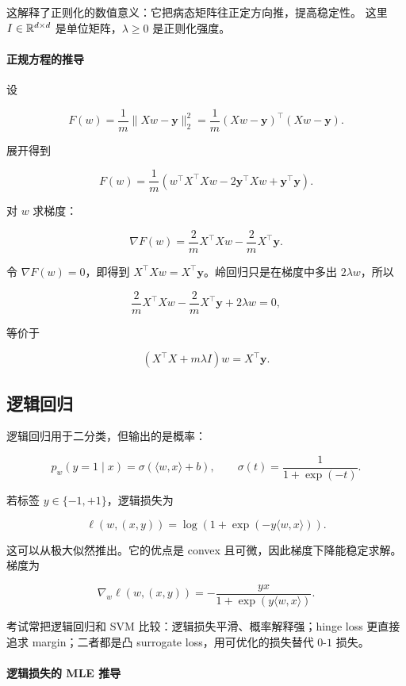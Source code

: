 这解释了正则化的数值意义：它把病态矩阵往正定方向推，提高稳定性。
这里 \(I\in\mathbb{R}^{d\times d}\) 是单位矩阵，\(\lambda\ge0\) 是正则化强度。

\paragraph{正规方程的推导}

设

\[
  F(w)=\frac1m\|Xw-\mathbf{y}\|_2^2
  =
  \frac1m(Xw-\mathbf{y})^\top(Xw-\mathbf{y}).
\]

展开得到

\[
  F(w)
  =
  \frac1m
  \left(
    w^\top X^\top Xw
    -
    2\mathbf{y}^\top Xw
    +
    \mathbf{y}^\top\mathbf{y}
  \right).
\]

对 \(w\) 求梯度：

\[
  \nabla F(w)
  =
  \frac{2}{m}X^\top Xw
  -
  \frac{2}{m}X^\top\mathbf{y}.
\]

令 \(\nabla F(w)=0\)，即得到 \(X^\top Xw=X^\top\mathbf{y}\)。岭回归只是在梯度中多出 \(2\lambda w\)，所以

\[
  \frac{2}{m}X^\top Xw
  -
  \frac{2}{m}X^\top\mathbf{y}
  +
  2\lambda w
  =
  0,
\]

等价于

\[
  (X^\top X+m\lambda I)w=X^\top\mathbf{y}.
\]

\subsection{逻辑回归}

逻辑回归用于二分类，但输出的是概率：

\[
  p_w(y=1\mid x)=\sigma(\langle w,x\rangle+b),
  \qquad
  \sigma(t)=\frac{1}{1+\exp(-t)}.
\]

若标签 \(y\in\{-1,+1\}\)，逻辑损失为

\[
  \ell(w,(x,y))
  =
  \log\left(1+\exp(-y\langle w,x\rangle)\right).
\]

这可以从极大似然推出。它的优点是 convex 且可微，因此梯度下降能稳定求解。梯度为

\[
  \nabla_w\ell(w,(x,y))
  =
  -\frac{y x}{1+\exp(y\langle w,x\rangle)}.
\]

考试常把逻辑回归和 SVM 比较：逻辑损失平滑、概率解释强；hinge loss 更直接追求 margin；二者都是凸 surrogate loss，用可优化的损失替代 \(0\)-\(1\) 损失。

\paragraph{逻辑损失的 MLE 推导}

